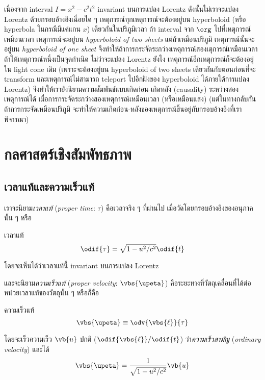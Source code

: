 เนื่องจาก interval $I = x^2 - c^2t^2$ invariant บนการแปลง Lorentz ดังนั้นไม่เราจะแปลง Lorentz ด้วยกรอบอ้างอิงเฉื่อยใด ๆ เหตุการณ์ทุกเหตุการณ์จะต้องอยู่บน hyperboloid (หรือ hyperbola ในกรณีมีแค่แกน $x$) เดียวกันในปริภูมิเวลา ถ้า interval จาก $\org$ ไปที่เหตุการณ์เหมือนเวลา เหตุการณ์จะอยู่บน \emph{hyperboloid of two sheets} แต่ถ้าเหมือนปริภูมิ เหตุการณ์นั้นจะอยู่บน \emph{hyperboloid of one sheet} จึงทำให้ถ้าการกระจัดระกว่างเหตุการณ์สองเตุการณ์เหมือนเวลา ถ้าให้เหตุการณ์หนึ่งเป็นจุดกำเนิด ไม่ว่าจะแปลง Lorentz ยังไง เหตุการณ์อีกเหตุการณ์ก็จะต้องอยู่ใน light cone เดิม (เพราะจะต้องอยู่บน hyperboloid of two sheets เดียวกันกับตอนก่อนที่จะ transform และเหตุการณ์ไม่สามารถ teleport ไปอีกฝั่งของ hyperboloid ได้ภายใต้การแปลง Lorentz) จึงทำให้เรายังนิยามความสัมพันธ์แบบเกิดก่อน-เกิดหลัง (causality) ระหว่างสองเหตุการณ์ได้ เมื่อการกระจัดระกว่างสองเหตุการณ์เหมือนเวลา (หรือเหมือนแสง) (แต่ในทางกลับกัน ถ้าการกระจัดเหมือนปริภูมิ จะทำให้ความเกิดก่อน-หลังของเหตุการณ์ขึ้นอยู่กับกรอบอ้างอิงที่เราพิจารณา)

\section{กลศาสตร์เชิงสัมพัทธภาพ}

\subsection{เวลาแท้และความเร็วแท้}

เราจะนิยาม\emph{เวลาแท้} (\emph{proper time}: $\tau$) คือเวลาจริง ๆ ที่ผ่านไป เมื่อวัดโดยกรอบอ้างอิงของอนุภาคนั้น ๆ หรือ
\begin{defbox}{เวลาแท้}
    \begin{equation}
        \odif{\tau} = \sqrt{1 - u^2/c^2}\odif{t}
    \end{equation}
\end{defbox}
โดยจะเห็นได้ว่าเวลาแท้นี้ invariant บนการแปลง Lorentz

และจะนิยาม\emph{ความเร็วแท้} (\emph{proper velocity}: $\vbs{\upeta}$) คือระยะทางที่วัตถุเคลื่อนที่ได้ต่อหน่วยเวลาแท้ของวัตถุนั้น ๆ หรือก็คือ
\begin{defbox}{ความเร็วแท้}
    \begin{equation}
        \vbs{\upeta} \equiv \odv{\vbs{\ell}}{\tau}
    \end{equation}
\end{defbox}
โดยจะเร็วความเร็ว $\vb{u}$ ปกติ ($\odif{\vbs{\ell}}/\odif{t}$) ว่า\emph{ความเร็วสามัญ} (\emph{ordinary velocity}) และได้
\begin{equation}
    \vbs{\upeta} = \frac{1}{\sqrt{1 - u^2/c^2}}\vb{u}
\end{equation}


